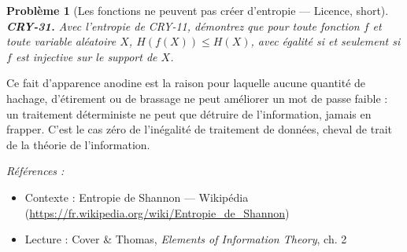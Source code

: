 \documentclass[11pt]{article}
\newtheorem{problem}{Problème}
\newenvironment{refs}{\par\small\noindent\emph{Références :}\begin{itemize}\setlength\itemsep{0pt}}{\end{itemize}\normalsize}
\begin{document}
\bigskip

\begin{problem}[{Les fonctions ne peuvent pas créer d'entropie --- Licence, short}]
\textbf{CRY-31.} Avec l'entropie de CRY-11, démontrez que pour toute
fonction $f$ et toute variable aléatoire $X$,
$ H(f(X)) \le H(X) $,
avec égalité si et seulement si $f$ est injective sur le support de $X$.
\end{problem}

\noindent Ce fait d'apparence anodine est la raison pour laquelle aucune quantité de
hachage, d'étirement ou de \og{} brassage \fg{} ne peut améliorer un mot de passe faible : un
traitement déterministe ne peut que détruire de l'information, jamais en frapper. C'est le
cas zéro de l'inégalité de traitement de données, cheval de trait de la théorie de
l'information.

\begin{refs}
\item Contexte : Entropie de Shannon --- Wikipédia (\url{https://fr.wikipedia.org/wiki/Entropie_de_Shannon})
\item Lecture : Cover \& Thomas, \textit{Elements of Information Theory}, ch. 2
\end{refs}

\bigskip
\end{document}
